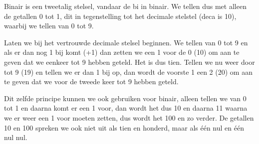 Binair is een tweetalig stelsel, vandaar de bi in binair. We tellen dus met alleen de getallen 0 tot 1, dit in tegenstelling tot het decimale stelstel (deca is 10), waarbij we tellen van 0 tot 9.

Laten we bij het vertrouwde decimale stelsel beginnen. We tellen van 0 tot 9 en als er dan nog 1 bij komt (+1) dan zetten we een 1 voor de 0 (10) om aan te geven dat we eenkeer tot 9 hebben geteld. Het is dus tien. Tellen we nu weer door tot 9 (19) en tellen we er dan 1 bij op, dan wordt de voorste 1 een 2 (20) om aan te geven dat we voor de tweede keer tot 9 hebben geteld.

Dit zelfde principe kunnen we ook gebruiken voor binair, alleen tellen we van 0 tot 1 en daarna komt er een 1 voor, dan wordt het dus 10 en daarna 11 waarna we er weer een 1 voor moeten zetten, dus wordt het 100 en zo verder. De getallen 10 en 100 spreken we ook niet uit als tien en honderd, maar als \'e\'en nul en \'e\'en nul nul.

